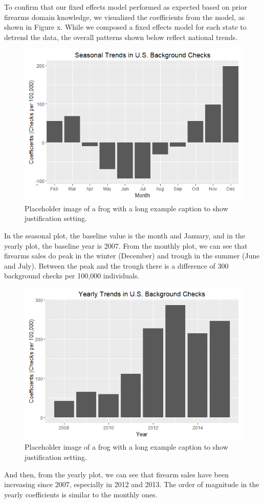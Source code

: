 \documentclass[9pt,twocolumn,twoside,lineno]{pnas-new}
\begin{document}
To confirm that our fixed effects model performed as expected based on prior firearms domain knowledge, we visualized the coefficients from the model, as shown in Figure x. While we composed a fixed effects model for each state to detrend the data, the overall patterns shown below reflect national trends. 
\begin{figure}%
  \centering
  \includegraphics[width=\linewidth]{figures/seasonal}
  \caption{Placeholder image of a frog with a long example caption to show justification setting.}
  \label{fig:monthly}
\end{figure}
	In the seasonal plot, the baseline value is the month and January, and in the yearly plot, the baseline year is 2007. From the monthly plot, we can see that firearms sales do peak in the winter (December) and trough in the summer (June and July). Between the peak and the trough there is a difference of 300 background checks per 100,000 individuals.
\begin{figure}%
  \centering
  \includegraphics[width=\linewidth]{figures/yearly}
  \caption{Placeholder image of a frog with a long example caption to show justification setting.}
  \label{fig:monthly}
\end{figure}  
    And then, from the yearly plot, we can see that firearm sales have been increasing since 2007, especially in 2012 and 2013. The order of magnitude in the yearly coefficients is similar to the monthly ones. 
    
\end{document}
